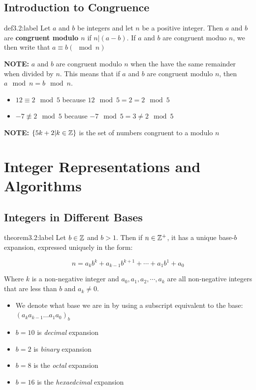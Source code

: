 \subsection{Introduction to Congruence}

\begin{definition}{def3.2:label}
    Let $a$ and $b$ be integers and let $n$ be a positive integer. Then $a$ and $b$ are \textbf{congruent modulo $n$} if $n|(a-b)$. If $a$ and $b$ are congruent moduo $n$, we then write that $a \equiv b (\mod n)$
\end{definition}

\textbf{NOTE:} $a$ and $b$ are congruent modulo $n$ when the have the same remainder when divided by $n$. This means that if $a$ and $b$ are congruent modulo $n$, then $a \mod n = b \mod n$.

\begin{itemize}
    \item $12 \equiv 2 \mod 5$ because $12 \mod 5 = 2 = 2 \mod 5$
    \item $-7 \not\equiv 2 \mod 5$ because $-7 \mod 5 = 3 \ne 2 \mod 5$
\end{itemize}

\textbf{NOTE:} $\{5k + 2 | k \in \mathbb{Z}\}$ is the set of numbers congruent to a modulo $n$



\section{Integer Representations and Algorithms}

\subsection{Integers in Different Bases}

\begin{theorem}{theorem3.2:label}
    Let $b \in \mathbb{Z}$ and $b > 1$. Then if $n \in \mathbb{Z}^+$, it has a unique base-$b$ expansion, expressed uniquely in the form:

    $$
    n = a_kb^k + a_{k-1}b^{k+1} + \cdots + a_1b^1 + a_0
    $$

    Where $k$ is a non-negative integer and $a_0,a_1,a_2,\cdots,a_k$ are all non-negative integers that are less than $b$ and $a_k \ne 0$.
\end{theorem}

\begin{itemize}
    \item We denote what base we are in by using a subscript equivalent to the base: $(a_ka_{k-1}...a_1a_0)_b$
    \item $b = 10$ is \textit{decimal} expansion
    \item $b = 2$ is \textit{binary} expansion
    \item $b=8$ is the \textit{octal} expansion
    \item $b = 16$ is the \textit{hexaedcimal} expansion
\end{itemize}

